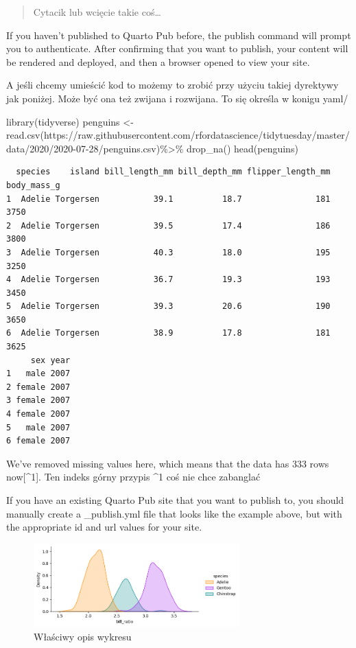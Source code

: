 \documentclass[
  a4paper,
  DIV=11,
  numbers=noendperiod,
  oneside,
  open=any]{scrreprt}
\newenvironment{Shaded}{\begin{snugshade}}{\end{snugshade}}
\newcommand{\FunctionTok}[1]{\textcolor[rgb]{0.28,0.35,0.67}{#1}}
\newcommand{\NormalTok}[1]{\textcolor[rgb]{0.00,0.23,0.31}{#1}}
\newcommand{\OtherTok}[1]{\textcolor[rgb]{0.00,0.23,0.31}{#1}}
\newcommand{\SpecialCharTok}[1]{\textcolor[rgb]{0.37,0.37,0.37}{#1}}
\newcommand{\StringTok}[1]{\textcolor[rgb]{0.13,0.47,0.30}{#1}}
\begin{document}
\begin{quote}
Cytacik lub wcięcie takie coś\ldots{}
\end{quote}

If you haven't published to Quarto Pub before, the publish command will
prompt you to authenticate. After confirming that you want to publish,
your content will be rendered and deployed, and then a browser opened to
view your site.

A jeśli chcemy umieścić kod to możemy to zrobić przy użyciu takiej
dyrektywy jak poniżej. Może być ona też zwijana i rozwijana. To się
określa w konigu yaml/

\begin{Shaded}
\begin{Highlighting}[]
\FunctionTok{library}\NormalTok{(tidyverse)}
\NormalTok{penguins }\OtherTok{\textless{}{-}} \FunctionTok{read.csv}\NormalTok{(}\StringTok{\textquotesingle{}https://raw.githubusercontent.com/rfordatascience/tidytuesday/master/data/2020/2020{-}07{-}28/penguins.csv\textquotesingle{}}\NormalTok{)}\SpecialCharTok{\%\textgreater{}\%}
  \FunctionTok{drop\_na}\NormalTok{()}
\FunctionTok{head}\NormalTok{(penguins)}
\end{Highlighting}
\end{Shaded}

\begin{verbatim}
  species    island bill_length_mm bill_depth_mm flipper_length_mm body_mass_g
1  Adelie Torgersen           39.1          18.7               181        3750
2  Adelie Torgersen           39.5          17.4               186        3800
3  Adelie Torgersen           40.3          18.0               195        3250
4  Adelie Torgersen           36.7          19.3               193        3450
5  Adelie Torgersen           39.3          20.6               190        3650
6  Adelie Torgersen           38.9          17.8               181        3625
     sex year
1   male 2007
2 female 2007
3 female 2007
4 female 2007
5   male 2007
6 female 2007
\end{verbatim}

We've removed missing values here, which means that the data has 333
rows now{[}\^{}1{]}. Ten indeks górny przypis \^{}1 coś nie chce
zabanglać

If you have an existing Quarto Pub site that you want to publish to, you
should manually create a \_publish.yml file that looks like the example
above, but with the appropriate id and url values for your site.

\begin{figure}[H]

{\centering \includegraphics[width=3.125in,height=\textheight]{graph1.png}

}

\caption{Właściwy opis wykresu}

\end{figure}%
\end{document}
